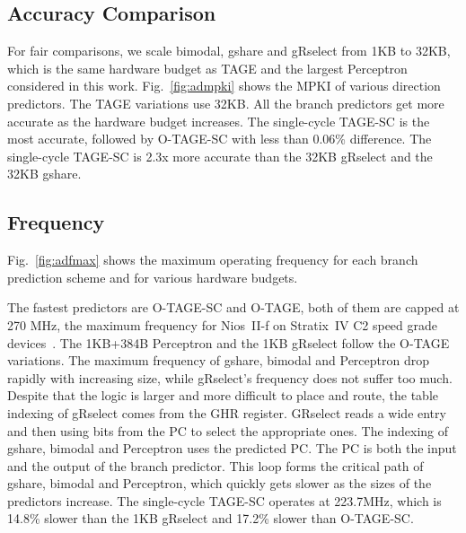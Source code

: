 \subsection{Accuracy Comparison}
\label{sec:eval:advanced:comparison}
For fair comparisons, we scale bimodal, gshare and gRselect from 1KB to 32KB, which is the same hardware budget as TAGE and the largest Perceptron considered in this work. Fig.~\ref{fig:admpki} shows the MPKI of various direction predictors. The TAGE variations use 32KB. All the branch predictors get more accurate as the hardware budget increases. The single-cycle \mbox{TAGE-SC} is the most accurate, followed by \mbox{O-TAGE-SC} with less than 0.06\% difference. The single-cycle \mbox{TAGE-SC} is \mytilde 2.3x more accurate than the 32KB gRselect and the 32KB gshare.

\subsection{Frequency}
\label{sec:eval:advanced:fmax}
Fig.~\ref{fig:adfmax} shows the maximum operating frequency for each branch prediction scheme and for various hardware budgets.

The fastest predictors are \mbox{O-TAGE-SC} and \mbox{O-TAGE}, both of them are capped at 270 MHz, the maximum frequency for Nios~II-f on Stratix~IV C2 speed grade devices~\cite{niosfmax}. The 1KB+384B Perceptron and the 1KB gRselect follow the \mbox{O-TAGE} variations. The maximum frequency of gshare, bimodal and Perceptron drop rapidly with increasing size, while gRselect's frequency does not suffer too much. Despite that the logic is larger and more difficult to place and route, the table indexing of gRselect comes from the GHR register. GRselect reads a wide entry and then using bits from the PC to select the appropriate ones. The indexing of gshare, bimodal and Perceptron uses  the predicted PC. The PC is both the input and the output of the branch predictor. This loop forms the critical path of gshare, bimodal and Perceptron, which quickly gets slower as the sizes of the predictors increase. The single-cycle \mbox{TAGE-SC} operates at 223.7MHz, which is 14.8\% slower than the 1KB gRselect and 17.2\% slower than \mbox{O-TAGE-SC}.

